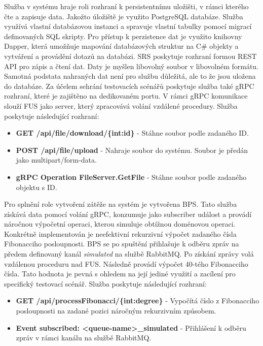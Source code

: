 
Služba v systému hraje roli rozhraní k persistentnímu uložišti, v rámci kterého čte a zapisuje data. Jakožto úložiště je využito PostgreSQL databáze. Služba využívá vlastní databázovou instanci a spravuje vlastní tabulky pomocí migrací definovaných SQL skripty. Pro přístup k perzistence dat je využito knihovny Dapper, která umožňuje mapování databázových struktur na C\# objekty a vytváření a provádění dotazů na databázi. SRS poskytuje rozhraní formou REST API pro zápis a čtení dat. Daty je myšlen libovolný soubor v libovolném formátu. Samotná podstata nahraných dat není pro službu důležitá, ale to že jsou uložena do databáze. Za účelem sehrání testovacích scénářů poskytuje služba také gRPC rozhraní, které je zajištěno na dedikovaném portu. V rámci gRPC komunikace slouží FUS jako server, který zpracovává volání vzdálené procedury. Služba poskytuje následující rozhraní:

\begin{itemize}
    \item \textbf{GET /api/file/download/\{int:id\}} - Stáhne soubor podle zadaného ID.
    \item \textbf{POST /api/file/upload} - Nahraje soubor do systému. Soubor je předán jako multipart/form-data.
    \item \textbf{gRPC Operation FileServer.GetFile} - Stáhne soubor podle zadaného objektu s ID.
\end{itemize}


Pro splnění role vytvoření zátěže na systém je vytvořena BPS. Tato služba získává data pomocí volání gRPC, konzumuje jako subscriber událost a provádí náročnou výpočetní operaci, kterou simuluje obtížnou doménovou operaci. Konkrétně implementován je neefektivní rekurzivní výpočet zadaného čísla Fibonacciho posloupnosti. BPS se po spuštění přihlašuje k odběru zpráv na předem definovaný kanál \emph{simulated} na službě RabbitMQ. Po získání zprávy volá vzdálenou proceduru nad FUS. Následně provádí výpočet 40-tého Fibonacciho čísla. Tato hodnota je pevná s ohledem na její jediné využití a zacílení pro specifický testovací scénář. Služba poskytuje následující rozhraní:

\begin{itemize}
    \item \textbf{GET /api/processFibonacci/\{int:degree\}} - Vypočítá číslo z Fibonacciho posloupnosti na zadané pozici náročným rekurzivním způsobem.
    \item \textbf{Event subscribed: <queue-name>\_simulated} - Přihlášení k odběru zpráv v rámci kanálu na službě RabbitMQ.
\end{itemize}

